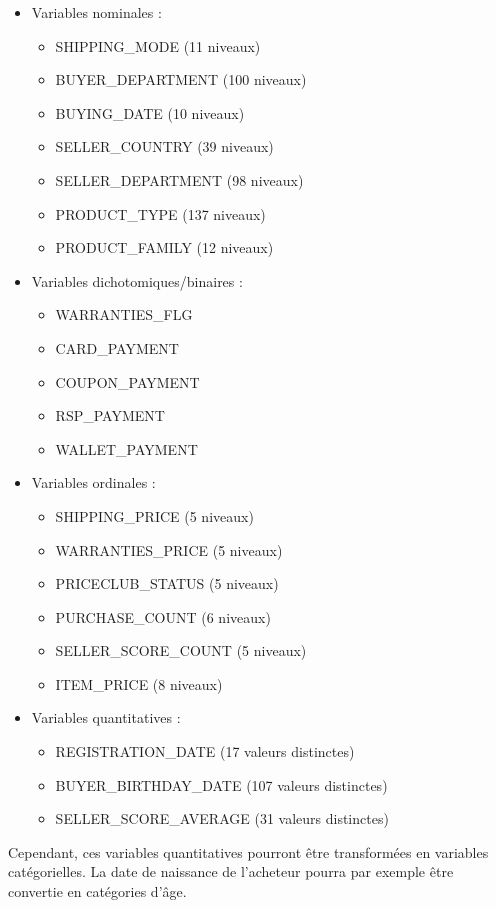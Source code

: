 \begin{itemize}
\item Variables nominales : 
	\begin{itemize}
	\item SHIPPING_MODE (11 niveaux)
	\item BUYER_DEPARTMENT (100 niveaux)
	\item BUYING_DATE (10 niveaux)
	\item SELLER_COUNTRY (39 niveaux)
	\item SELLER_DEPARTMENT (98 niveaux)
	\item PRODUCT_TYPE (137 niveaux)
	\item PRODUCT_FAMILY (12 niveaux)
	\end{itemize}
\item Variables dichotomiques/binaires :
	\begin{itemize}
	\item WARRANTIES_FLG
	\item CARD_PAYMENT
	\item COUPON_PAYMENT
	\item RSP_PAYMENT
	\item WALLET_PAYMENT
	\end{itemize}
\item Variables ordinales :
	\begin{itemize}
	\item SHIPPING_PRICE (5 niveaux)
	\item WARRANTIES_PRICE (5 niveaux)
	\item PRICECLUB_STATUS (5 niveaux)
	\item PURCHASE_COUNT (6 niveaux)
	\item SELLER_SCORE_COUNT (5 niveaux)
	\item ITEM_PRICE (8 niveaux)
	\end{itemize}
\item Variables quantitatives :
	\begin{itemize}
	\item REGISTRATION_DATE (17 valeurs distinctes)
	\item BUYER_BIRTHDAY_DATE (107 valeurs distinctes)
	\item SELLER_SCORE_AVERAGE (31 valeurs distinctes)
	\end{itemize}
\end{itemize}

Cependant, ces variables quantitatives pourront être transformées en variables catégorielles.
La date de naissance de l'acheteur pourra par exemple être convertie en catégories d'âge.    
    
